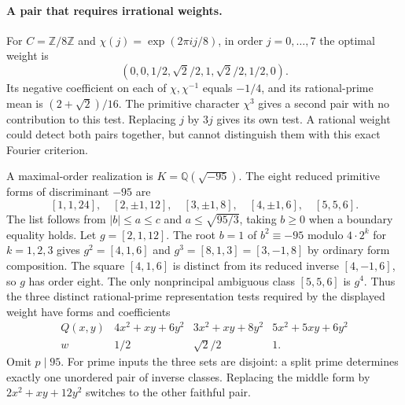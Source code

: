 \paragraph{A pair that requires irrational weights.}
For $C=\mathbb Z/8\mathbb Z$ and $\chi(j)=\exp(2\pi i j/8)$, in order
$j=0,\ldots,7$ the optimal weight is
\[
 (0,0,1/2,\sqrt2/2,1,\sqrt2/2,1/2,0).
\]
Its negative coefficient on each of $\chi,\chi^{-1}$ equals $-1/4$,
and its rational-prime mean is $(2+\sqrt2)/16$. The primitive character
$\chi^3$ gives a second pair with no contribution to this test. Replacing
$j$ by $3j$ gives its own test. A rational weight could detect both pairs
together, but cannot distinguish them with this exact Fourier criterion.

A maximal-order realization is $K=\mathbb Q(\sqrt{-95})$.
The eight reduced primitive forms of discriminant $-95$ are
\[
 [1,1,24],\quad[2,\pm1,12],\quad[3,\pm1,8],\quad
 [4,\pm1,6],\quad[5,5,6].
\]
The list follows from $|b|\le a\le c$ and $a\le\sqrt{95/3}$, taking
$b\ge0$ when a boundary equality holds. Let $g=[2,1,12]$. The root
$b=1$ of $b^2\equiv-95$ modulo $4\cdot 2^k$ for $k=1,2,3$ gives
$g^2=[4,1,6]$ and $g^3=[8,1,3]=[3,-1,8]$ by ordinary form composition.
The square $[4,1,6]$ is distinct from its reduced inverse $[4,-1,6]$,
so $g$ has order eight. The only nonprincipal ambiguous class
$[5,5,6]$ is $g^4$. Thus the three distinct rational-prime representation
tests required by the displayed weight have forms and coefficients
\[
 \begin{array}{c|ccc}
 Q(x,y)&4x^2+xy+6y^2&3x^2+xy+8y^2&5x^2+5xy+6y^2\\\hline
 w&1/2&\sqrt2/2&1 .
 \end{array}
\]
Omit $p\mid95$. For prime inputs the three sets are disjoint: a split
prime determines exactly one unordered pair of inverse classes. Replacing
the middle form by $2x^2+xy+12y^2$ switches to the other faithful pair.
